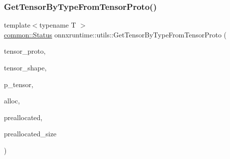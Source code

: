 \subsubsection{\texorpdfstring{Get\+Tensor\+By\+Type\+From\+Tensor\+Proto()}{GetTensorByTypeFromTensorProto()}}
{\footnotesize\ttfamily template$<$typename T $>$ \\
\mbox{\hyperlink{classonnxruntime_1_1common_1_1Status}{common\+::\+Status}} onnxruntime\+::utils\+::\+Get\+Tensor\+By\+Type\+From\+Tensor\+Proto (\begin{DoxyParamCaption}\item[{const Tensor\+Proto \&}]{tensor\+\_\+proto,  }\item[{const \mbox{\hyperlink{classonnxruntime_1_1TensorShape}{Tensor\+Shape}} \&}]{tensor\+\_\+shape,  }\item[{std\+::unique\+\_\+ptr$<$ \mbox{\hyperlink{classonnxruntime_1_1Tensor}{Tensor}} $>$ $\ast$}]{p\+\_\+tensor,  }\item[{\mbox{\hyperlink{namespaceonnxruntime_a6cdac724c5dcefded3a63f08dae58fda}{Allocator\+Ptr}}}]{alloc,  }\item[{\mbox{\hyperlink{mlasi_8h_a88f941d423cb2a819b70a1358982b1a6}{void}} $\ast$}]{preallocated,  }\item[{\mbox{\hyperlink{mlasi_8h_a503efbc1c6e50825320ad909366b78ab}{size\+\_\+t}}}]{preallocated\+\_\+size }\end{DoxyParamCaption})}

\mbox{\label{namespaceonnxruntime_1_1utils_a969c0e118d0d6c6ef5d023abadaad937}} 
